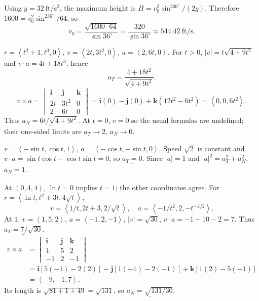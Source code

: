 \documentclass[10pt]{article}
\newcommand{\handstyleA}{\handA\fontsize{9.45}{11.35}\selectfont}
\newcommand{\handstyleC}{\handC\fontsize{9.55}{11.45}\selectfont}
\newcommand{\handstyleD}{\handD\fontsize{9.25}{11.25}\selectfont}
\newcommand{\ex}[1]{\par\addvspace{6pt}\noindent\llap{\makebox[.62in][r]{\large\bfseries #1.\hspace{.12in}}}\ignorespaces}
\newcommand{\ans}[1]{\underline{#1}}
\newcommand{\vv}[1]{\left\langle #1\right\rangle}
\newcommand{\ii}{\mathbf i}\newcommand{\jj}{\mathbf j}\newcommand{\kk}{\mathbf k}
\newcommand{\cp}[6]{\begin{vmatrix}\ii&\jj&\kk\\#1&#2&#3\\#4&#5&#6\end{vmatrix}}
\begin{document}
\handstyleC
\ex{27}
Using $g=32\ \mathrm{ft/s^2}$, the maximum height is $H=v_0^2\sin^236^\circ/(2g)$. Therefore $1600=v_0^2\sin^236^\circ/64$, so
\[\ans{v_0=\frac{\sqrt{1600\cdot64}}{\sin36^\circ}=\frac{320}{\sin36^\circ}\approx544.42\ \mathrm{ft/s}}.\]
\handstyleA
\ex{37}
$r=\vv{t^2+1,t^3,0}$, $v=\vv{2t,3t^2,0}$, $a=\vv{2,6t,0}$. For $t>0$, $|v|=t\sqrt{4+9t^2}$ and $v\cdot a=4t+18t^3$, hence
\[\ans{a_T=\frac{4+18t^2}{\sqrt{4+9t^2}}}.\]
\[v\times a=\cp{2t}{3t^2}{0}{2}{6t}{0}=\ii(0)-\jj(0)+\kk(12t^2-6t^2)=\vv{0,0,6t^2}.\]
Thus $\ans{a_N=6t/\sqrt{4+9t^2}}$. At $t=0$, $v=0$ so the usual formulas are undefined; their one-sided limits are $a_T\to2$, $a_N\to0$.
\handstyleD
\ex{39}
$v=\vv{-\sin t,\cos t,1}$, $a=\vv{-\cos t,-\sin t,0}$. Speed $\sqrt2$ is constant and $v\cdot a=\sin t\cos t-\cos t\sin t=0$, so $\ans{a_T=0}$. Since $|a|=1$ and $|a|^2=a_T^2+a_N^2$, $\ans{a_N=1}$.
\handstyleA
\ex{41}
At $(0,4,4)$, $\ln t=0$ implies $t=1$; the other coordinates agree. For $r=\vv{\ln t,t^2+3t,4\sqrt t}$,
\[v=\vv{1/t,2t+3,2/\sqrt t},\quad a=\vv{-1/t^2,2,-t^{-3/2}}.\]
At $1$, $v=\vv{1,5,2}$, $a=\vv{-1,2,-1}$, $|v|=\sqrt{30}$, $v\cdot a=-1+10-2=7$. Thus $\ans{a_T=7/\sqrt{30}}$.
\begin{align*}v\times a&=\cp{1}{5}{2}{-1}{2}{-1}\\&=\ii[5(-1)-2(2)]-\jj[1(-1)-2(-1)]+\kk[1(2)-5(-1)]\\&=\vv{-9,-1,7}.
\end{align*}
Its length is $\sqrt{81+1+49}=\sqrt{131}$, so $\ans{a_N=\sqrt{131/30}}$.
\end{document}
